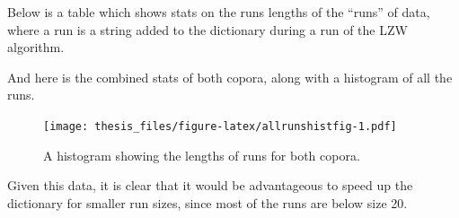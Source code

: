 \documentclass[12pt,twoside]{reedthesis}
\begin{document}
Below is a table which shows stats on the runs lengths of the ``runs'' of data, where a run is a string added to the dictionary during a run of the LZW algorithm.
\begin{table}[!h]

\caption{\label{tab:runstatsfig}Run Lengths for Corpus 1}
\centering
{}
\end{table}
\begin{table}[!h]

\caption{\label{tab:runstatsfig}Run Lengths for Corpus 2}
\centering
{}
\end{table}
And here is the combined stats of both copora, along with a histogram of all the runs.
\begin{table}[!h]

\caption{\label{tab:bothrunsfig}Run lengths for both corpora}
\centering
{}
\end{table}
\begin{figure}
\centering
\texttt{[image: thesis\_files/figure-latex/allrunshistfig-1.pdf]}
\caption{\label{fig:allrunshistfig}A histogram showing the lengths of runs for both copora.}
\end{figure}
Given this data, it is clear that it would be advantageous to speed up the dictionary for smaller run sizes, since most of the runs are below size 20.
\end{document}
